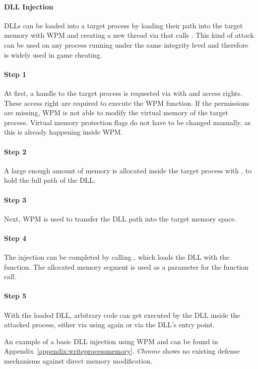 \paragraph{ \gls{DLL} Injection}
\glspl{DLL} can be loaded into a target process by loading their path into the target memory with \gls{WPM} and creating a new thread via  that calls . This kind of attack can be used on any process running under the same integrity level and therefore is widely used in game cheating.

\paragraph{Step 1} 
At first, a handle to the target process is requested via  with  and  access rights. These access right are required to execute the \gls{WPM} function. If the permissions are missing, \gls{WPM} is not able to modify the virtual memory of the target process. Virtual memory protection flags do not have to be changed manually, as this is already happening inside \gls{WPM}. 

\paragraph{Step 2} 
A large enough amount of memory is allocated inside the target process with , to hold the full path of the \gls{DLL}. 

\paragraph{Step 3}
Next, \gls{WPM} is used to transfer the \gls{DLL} path into the target memory space.

\paragraph{Step 4}
The injection can be completed by calling , which loads the \gls{DLL} with the  function. The allocated memory segment is used as a parameter for the  function call. 

\paragraph{Step 5}
With the loaded \gls{DLL}, arbitrary code can get executed by the \gls{DLL} inside the attacked process, either via using  again or via the \gls{DLL}'s entry point.


An example of a basic \gls{DLL} injection using \gls{WPM} and  can be found in Appendix~\ref{appendix:writeprocessmemory}. \emph{Chrome} shows no existing defense mechanisms against direct memory modification.